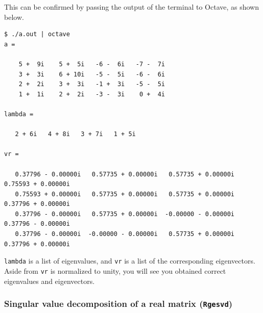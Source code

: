 \documentclass[12pt]{article}
\begin{document}
This can be confirmed by passing the output of the terminal to Octave, as shown below.
{\footnotesize
\begin{verbatim}
$ ./a.out | octave
a =

    5 +  9i    5 +  5i   -6 -  6i   -7 -  7i
    3 +  3i    6 + 10i   -5 -  5i   -6 -  6i
    2 +  2i    3 +  3i   -1 +  3i   -5 -  5i
    1 +  1i    2 +  2i   -3 -  3i    0 +  4i

lambda =

   2 + 6i   4 + 8i   3 + 7i   1 + 5i

vr =

   0.37796 - 0.00000i   0.57735 + 0.00000i   0.57735 + 0.00000i   0.75593 + 0.00000i
   0.75593 + 0.00000i   0.57735 + 0.00000i   0.57735 + 0.00000i   0.37796 + 0.00000i
   0.37796 - 0.00000i   0.57735 + 0.00000i  -0.00000 - 0.00000i   0.37796 - 0.00000i
   0.37796 - 0.00000i  -0.00000 - 0.00000i   0.57735 + 0.00000i   0.37796 + 0.00000i

\end{verbatim}
}
{\tt lambda} is a list of eigenvalues, and {\tt vr} is a list of the corresponding eigenvectors. Aside from {\tt vr} is normalized
to unity, you will see you obtained correct eigenvalues and eigenvectors.

\subsubsection{Singular value decomposition of a real matrix ({\tt Rgesvd})}
\end{document}

